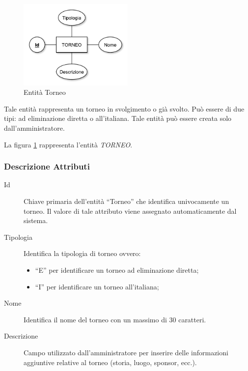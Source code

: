 		\begin{figure}[h]
			\centering
			\includegraphics[width=0.5\textwidth]
			{immagini/06-torneo}
			
			\caption{Entità Torneo}
			\label{entita-torneo}
		\end{figure}
		
		Tale entità rappresenta un torneo in svolgimento o già svolto. Può essere di due tipi: ad eliminazione diretta o all'italiana. Tale entità può essere creata solo dall'amministratore.
		
		La figura \ref{entita-torneo} rappresenta l'entità \emph{TORNEO}.
		
		\subsubsection*{Descrizione Attributi}
		
		\begin{description}
			
			\item[Id]
			Chiave primaria dell'entità ``Torneo'' che identifica univocamente un torneo. Il valore di tale attributo viene assegnato automaticamente dal sistema.
			
			\item[Tipologia]
			Identifica la tipologia di torneo ovvero:
			\begin{itemize}
				\item
				``E'' per identificare un torneo ad eliminazione diretta;
				\item
				``I'' per identificare un torneo all'italiana;
			\end{itemize}
			
			\item[Nome]
			Identifica il nome del torneo con un massimo di 30 caratteri.
			
			\item[Descrizione]
			Campo utilizzato dall'amministratore per inserire delle informazioni aggiuntive relative al torneo (storia, luogo, sponsor, ecc.).
			
		\end{description}
		
